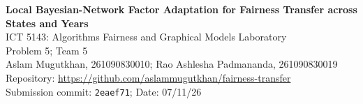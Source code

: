 \documentclass[11pt,a4paper]{article}
\newcommand{\ProjectTitle}{Local Bayesian-Network Factor Adaptation for Fairness Transfer across States and Years}
\newcommand{\EO}{\Delta_{\mathrm{EOdds}}}
\begin{document}
\begin{center}
{\Large\bfseries \ProjectTitle}\\[4pt]
ICT 5143: Algorithms Fairness and Graphical Models Laboratory\\
Problem 5; Team 5\\
Aslam Mugutkhan, 261090830010; Rao Ashlesha Padmananda, 261090830019\\
{\small Repository: \url{https://github.com/aslammugutkhan/fairness-transfer}\\
Submission commit: \texttt{2eaef71}; Date: 07/11/26}
\end{center}
\begin{abstract}
Can updating at most two shifted Bayesian-network factors preserve equalized odds better than global adaptation when
only 200 or 1,000 target labels are available? On ACSIncome (CA, TX, NY; 2018--2019; nine transfers) we propose BN-LFA:
Bayes-factor $\times$ decision-impact factor selection, then equalized-odds thresholds refitted on source data reweighted
by the selected factors. BN-LFA was fairer than target threshold adjustment (mean $\EO$ $-0.039$ and $-0.065$, Holm
$p=0.006$) and than updating every factor at $n=200$ ($-0.014$, $p=0.032$), but not than covariate reweighting, and not
clearly than keeping the source rule.
\end{abstract}
\end{document}
